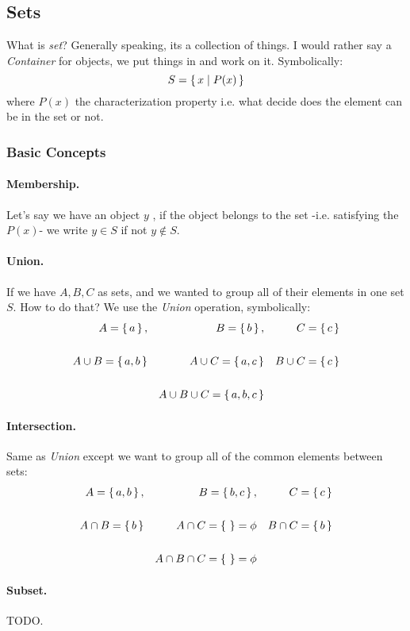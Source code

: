 \subsection{Sets}
What is {\it set}? Generally speaking, its a collection of things. I would rather say a {\it Container} for objects, we put things in and work on it. Symbolically:
$$
S = \set{x \mid P(x)}
$$
where $P(x)$ the characterization property i.e. what decide does the element can be in the set or not.
\subsubsection{Basic Concepts}
\paragraph{Membership.}
Let's say we have an object $y$ , if the object belongs to the set -i.e. satisfying the $P(x)$- we write $y \in S$ if not $y \not\in S$.
\paragraph{Union.}
If we have $A,B,C$ as sets, and we wanted to group all of their elements in one set $S$. How to do that? We use the {\it Union} operation, symbolically:
\begin{align*}
        \space A = \set{a} , && B = \set{b} , && C = \set{c} \\
        \\ 
        A \cup B = \set{a,b} && A \cup C = \set{a,c} && B \cup C = \set{c} \\
        \\
        && A \cup B \cup C = \set{a,b,c}
\end{align*}
\paragraph{Intersection.}
Same as {\it Union } except we want to group all of the common elements between sets:
\begin{align*}
        \space A = \set{a,b} , && B = \set{b,c} , && C = \set{c} \\
        \\ 
        A \cap B = \set{b} && A \cap C = \set{ } = \phi && B \cap C = \set{b} \\
        \\
        && A \cap B \cap C = \set{ } = \phi
\end{align*}
\paragraph{Subset.}
TODO.
